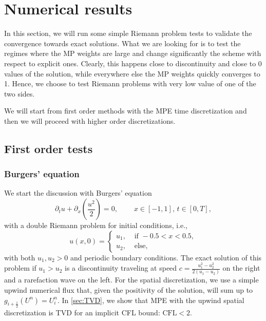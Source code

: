 \documentclass[final,11pt, times, linenumber, nopreprintline]{elsarticle}
\begin{document}
%

\section{Numerical results}\label{se_numerics}

In this section, we will run some simple Riemann problem tests to validate the convergence towards exact solutions. What we are looking for is to test the regimes where the MP weights are large and change significantly the scheme with respect to explicit ones. Clearly, this happens close to discontinuity and close to 0 values of the solution, while everywhere else the MP weights quickly converges to 1. Hence, we choose to test Riemann problems with very low value of one of the two sides.

We will start from first order methods with the MPE time discretization and then we will proceed with higher order discretizations.  

\subsection{First order tests}
\subsubsection{Burgers' equation}
We start the discussion with Burgers' equation 
\begin{equation}\label{eq:Burgers}
\partial_t u +\partial_x \left(\frac{u^2}{2}\right)=0,\ \qquad x \in [-1,1],\, t\in[0,T],
\end{equation}
with a double Riemann problem for initial conditions, i.e.,
\begin{equation}\label{eq:RP}
    u(x,0) = \begin{cases}
        u_1, &\text{ if }-0.5<x<0.5,\\
        u_2, &\text{ else},
    \end{cases}
\end{equation}
with both $u_1,u_2>0$ and periodic boundary conditions. The exact solution of this problem if $u_1>u_2$ is a discontinuity traveling at speed $c = \frac{u_1^2-u_2^2}{2(u_1-u_2)}$ on the right and a rarefaction wave on the left.
For the spatial discretization, we use a simple upwind numerical flux that, given the positivity of the solution, will sum up to $g_{i+\frac12}(U^n) = U^n_{i}$.
In \ref{sec:TVD}, we show that MPE with the upwind spatial discretization is TVD for an implicit CFL bound: $\text{CFL}<2$.
\end{document}
